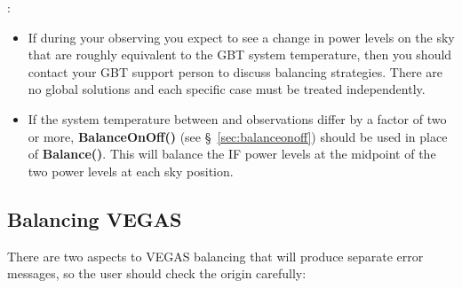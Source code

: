 :
\begin{itemize}[leftmargin=*]
\item If during your observing you expect to see a change in power levels on
the sky that are roughly equivalent to the \gls{GBT} system temperature, then
you should contact your \gls{GBT} support person to discuss balancing strategies.
There are no global solutions and each specific case must be treated independently.

\item If the system temperature between  and  observations
differ by a factor of two or more, {\bfseries{\textcolor{pythonKeywords}{BalanceOnOff}}()}
(see \S~\ref{sec:balanceonoff}) should be used in place of
{\bfseries{\textcolor{pythonKeywords}{Balance}}()}. This will balance the \gls{IF}
power levels at the midpoint of the two power levels at each sky position.

\end{itemize}

\newpage

\subsection{Balancing VEGAS}

There are two aspects to \gls{VEGAS} balancing that will produce separate error
messages, so the user should check the origin carefully:

